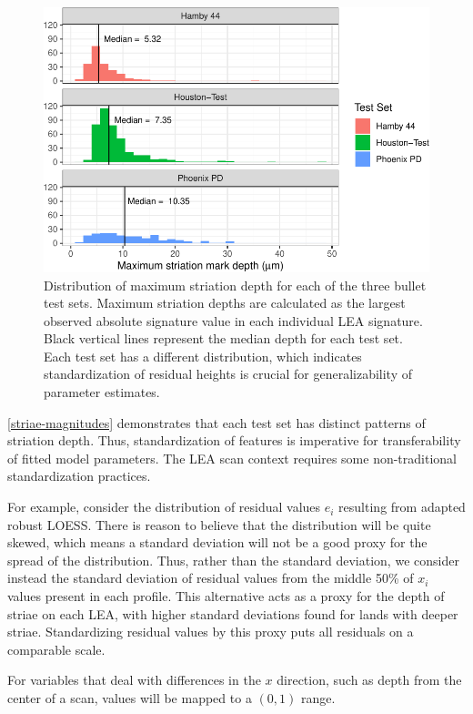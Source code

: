 \documentclass[12pt]{article}
\begin{document}
\begin{figure}
\centering
\includegraphics{writeup_files/figure-latex/striae-magnitudes-1.pdf}
\caption{\label{striae-magnitudes}Distribution of maximum striation
depth for each of the three bullet test sets. Maximum striation depths
are calculated as the largest observed absolute signature value in each
individual LEA signature. Black vertical lines represent the median
depth for each test set. Each test set has a different distribution,
which indicates standardization of residual heights is crucial for
generalizability of parameter estimates.}
\end{figure}

\autoref{striae-magnitudes} demonstrates that each test set has distinct
patterns of striation depth. Thus, standardization of features is
imperative for transferability of fitted model parameters. The LEA scan
context requires some non-traditional standardization practices.

For example, consider the distribution of residual values \(e_i\)
resulting from adapted robust LOESS. There is reason to believe that the
distribution will be quite skewed, which means a standard deviation will
not be a good proxy for the spread of the distribution. Thus, rather
than the standard deviation, we consider instead the standard deviation
of residual values from the middle 50\% of \(x_i\) values present in
each profile. This alternative acts as a proxy for the depth of striae
on each LEA, with higher standard deviations found for lands with deeper
striae. Standardizing residual values by this proxy puts all residuals
on a comparable scale.

For variables that deal with differences in the \(x\) direction, such as
depth from the center of a scan, values will be mapped to a \((0, 1)\)
range.
\end{document}
